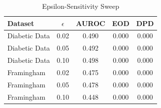 \begin{table}[H]
\centering
\caption{Epsilon-Sensitivity Sweep}
\label{tab:epsilon_sensitivity}
\begin{tabular}{lcccc}
\toprule
Dataset & $\epsilon$ & AUROC & EOD & DPD \\
\midrule
Diabetic Data & 0.02 & 0.490 & 0.000 & 0.000 \\
Diabetic Data & 0.05 & 0.492 & 0.000 & 0.000 \\
Diabetic Data & 0.10 & 0.498 & 0.000 & 0.000 \\
Framingham & 0.02 & 0.475 & 0.000 & 0.000 \\
Framingham & 0.05 & 0.478 & 0.000 & 0.000 \\
Framingham & 0.10 & 0.448 & 0.000 & 0.000 \\
\bottomrule
\end{tabular}
\end{table}
